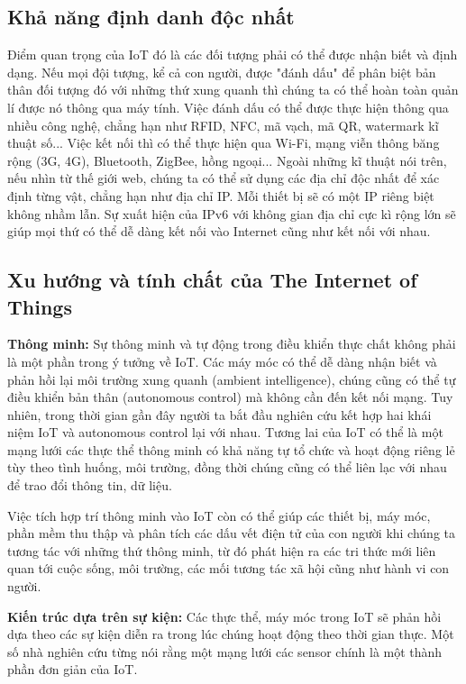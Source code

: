 \subsection*{Khả năng định danh độc nhất }
Điểm quan trọng của IoT đó là các đối tượng phải có thể được nhận biết và định dạng. Nếu mọi đội tượng, kể cả con người, được "đánh dấu" để phân biệt bản thân đối tượng đó với những thứ xung quanh thì chúng ta có thể hoàn toàn quản lí được nó thông qua máy tính. Việc đánh dấu có thể được thực hiện thông qua nhiều công nghệ, chẳng hạn như RFID, NFC, mã vạch, mã QR, watermark kĩ thuật số... Việc kết nối thì có thể thực hiện qua Wi-Fi, mạng viễn thông băng rộng (3G, 4G), Bluetooth, ZigBee, hồng ngoại...
Ngoài những kĩ thuật nói trên, nếu nhìn từ thế giới web, chúng ta có thể sử dụng các địa chỉ độc nhất để xác định từng vật, chẳng hạn như địa chỉ IP. Mỗi thiết bị sẽ có một IP riêng biệt không nhầm lẫn. Sự xuất hiện của IPv6 với không gian địa chỉ cực kì rộng lớn sẽ giúp mọi thứ có thể dễ dàng kết nối vào Internet cũng như kết nối với nhau.

\subsection*{Xu hướng và tính chất của The Internet of Things }
\textbf{Thông minh:} Sự thông minh và tự động trong điều khiển thực chất không phải là một phần trong ý tưởng về IoT. Các máy móc có thể dễ dàng nhận biết và phản hồi lại môi trường xung quanh (ambient intelligence), chúng cũng có thể tự điều khiển bản thân (autonomous control) mà không cần đến kết nối mạng. Tuy nhiên, trong thời gian gần đây người ta bắt đầu nghiên cứu kết hợp hai khái niệm IoT và autonomous control lại với nhau. Tương lai của IoT có thể là một mạng lưới các thực thể thông minh có khả năng tự tổ chức và hoạt động riêng lẻ tùy theo tình huống, môi trường, đồng thời chúng cũng có thể liên lạc với nhau để trao đổi thông tin, dữ liệu.

Việc tích hợp trí thông minh vào IoT còn có thể giúp các thiết bị, máy móc, phần mềm thu thập và phân tích các dấu vết điện tử của con người khi chúng ta tương tác với những thứ thông minh, từ đó phát hiện ra các tri thức mới liên quan tới cuộc sống, môi trường, các mối tương tác xã hội cũng như hành vi con người.

\textbf{Kiến trúc dựa trên sự kiện:} Các thực thể, máy móc trong IoT sẽ phản hồi dựa theo các sự kiện diễn ra trong lúc chúng hoạt động theo thời gian thực. Một số nhà nghiên cứu từng nói rằng một mạng lưới các sensor chính là một thành phần đơn giản của IoT.

